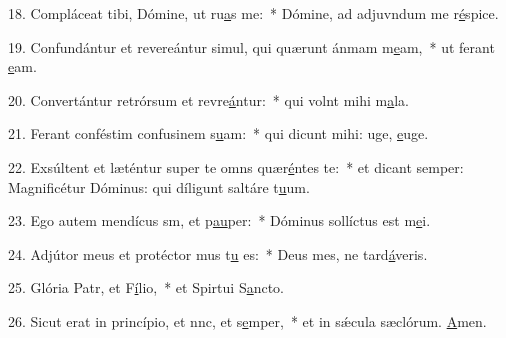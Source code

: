18. Compláceat tibi, Dómine, ut ru\uline{a}s me:~* Dómine, ad adjuvndum me r\uline{é}spice.\par 
19. Confundántur et revereántur simul, qui quærunt ánmam m\uline{e}am,~* ut ferant \uline{e}am.\par 
20. Convertántur retrórsum et revre\uline{á}ntur:~* qui volnt mihi m\uline{a}la.\par 
21. Ferant conféstim confusinem s\uline{u}am:~* qui dicunt mihi: uge, \uline{e}uge.\par 
22. Exsúltent et læténtur super te omns quær\uline{é}ntes te:~* et dicant semper: Magnificétur Dóminus: qui díligunt saltáre t\uline{u}um.\par 
23. Ego autem mendícus sm, et p\uline{au}per:~* Dóminus sollíctus est m\uline{e}i.\par 
24. Adjútor meus et protéctor mus t\uline{u} es:~* Deus mes, ne tard\uline{á}veris.\par 
25. Glória Patr, et F\uline{í}lio,~* et Spirtui S\uline{a}ncto.\par 
26. Sicut erat in princípio, et nnc, et s\uline{e}mper,~* et in sǽcula sæclórum. \uline{A}men.\par 
